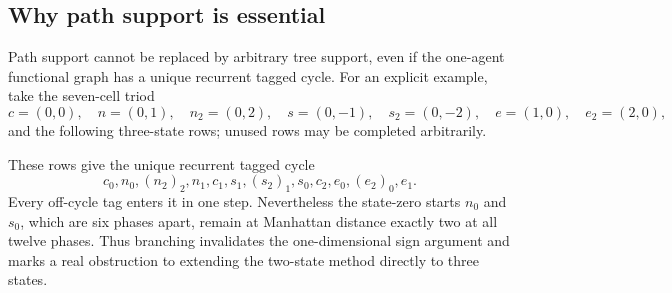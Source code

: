 \subsection{Why path support is essential}\label{app:branching-example}
Path support cannot be replaced by arbitrary tree support, even if the one-agent functional graph has a unique recurrent tagged cycle.  For an explicit example, take the seven-cell triod
\[
 c=(0,0),\quad n=(0,1),\quad n_2=(0,2),\quad
 s=(0,-1),\quad s_2=(0,-2),\quad e=(1,0),\quad e_2=(2,0),
\]
and the following three-state rows; unused rows may be completed arbitrarily.



These rows give the unique recurrent tagged cycle
\[
 c_0,n_0,(n_2)_2,n_1,c_1,s_1,(s_2)_1,s_0,c_2,e_0,(e_2)_0,e_1.
\]
Every off-cycle tag enters it in one step.  Nevertheless the state-zero starts $n_0$ and $s_0$, which are six phases apart, remain at Manhattan distance exactly two at all twelve phases.  Thus branching invalidates the one-dimensional sign argument and marks a real obstruction to extending the two-state method directly to three states.
